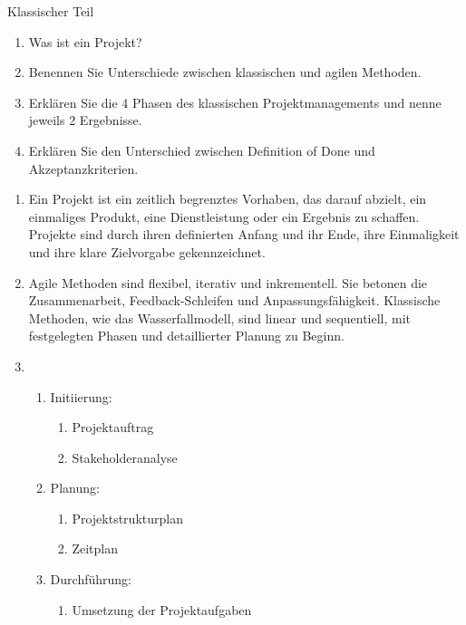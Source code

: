 \documentclass{article}
\begin{document}
\begin{exercise}{Klassischer Teil}
  \begin{enumerate}
    \item Was ist ein Projekt?
    \item Benennen Sie Unterschiede zwischen klassischen und agilen Methoden.
    \item Erklären Sie die 4 Phasen des klassischen Projektmanagements und nenne jeweils 2 Ergebnisse.
    \item Erklären Sie den Unterschied zwischen Definition of Done und Akzeptanzkriterien.
  \end{enumerate}

  \begin{solution}
    \begin{enumerate}
      \item Ein Projekt ist ein zeitlich begrenztes Vorhaben, das darauf abzielt, ein einmaliges Produkt, eine Dienstleistung oder ein Ergebnis zu schaffen. Projekte sind durch ihren definierten Anfang und ihr Ende, ihre Einmaligkeit und ihre klare Zielvorgabe gekennzeichnet.
      \item Agile Methoden sind flexibel, iterativ und inkrementell. Sie betonen die Zusammenarbeit, Feedback-Schleifen und Anpassungsfähigkeit. Klassische Methoden, wie das Wasserfallmodell, sind linear und sequentiell, mit festgelegten Phasen und detaillierter Planung zu Beginn.
      \item
            \begin{enumerate}
              \item Initiierung:
                    \begin{enumerate}
                      \item Projektauftrag
                      \item Stakeholderanalyse
                    \end{enumerate}
              \item Planung:
                    \begin{enumerate}
                      \item Projektstrukturplan
                      \item Zeitplan
                    \end{enumerate}
              \item Durchführung:
                    \begin{enumerate}
                      \item Umsetzung der Projektaufgaben

\end{enumerate}
\end{enumerate}
\end{enumerate}
\end{solution}
\end{exercise}
\end{document}
